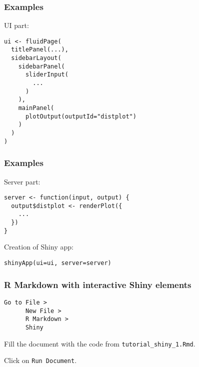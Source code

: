 \documentclass{beamer}
\begin{document}
	\begin{frame}[fragile]
		\frametitle{Examples}

		UI part:

		\begin{exampleblock}{}
		\begin{BVerbatim}
ui <- fluidPage(
  titlePanel(...),
  sidebarLayout(
    sidebarPanel(
      sliderInput(
        ...
      )
    ),
    mainPanel(
      plotOutput(outputId="distplot")
    )
  )
)
		\end{BVerbatim}
		\end{exampleblock}{}

	\end{frame}

	\begin{frame}[fragile]
		\frametitle{Examples}

		Server part:

		\begin{exampleblock}{}
		\begin{BVerbatim}
server <- function(input, output) {
  output$distplot <- renderPlot({
    ...
  })
}
		\end{BVerbatim}
		\end{exampleblock}{}

		\vspace{2em}

		Creation of Shiny app:

		\begin{exampleblock}{}
		\begin{BVerbatim}
shinyApp(ui=ui, server=server)
		\end{BVerbatim}
		\end{exampleblock}{}
	
	\end{frame}

	\begin{frame}[fragile]
		\frametitle{R Markdown with interactive Shiny elements}

		\begin{exampleblock}{}
		\begin{BVerbatim}
Go to File >
      New File >
      R Markdown >
      Shiny
		\end{BVerbatim}
		\end{exampleblock}{}

		\vspace{2em}

		Fill the document with the code from \verb|tutorial_shiny_1.Rmd|.

		\vspace{2em}

		Click on \verb|Run Document|.
	
	\end{frame}
\end{document}
